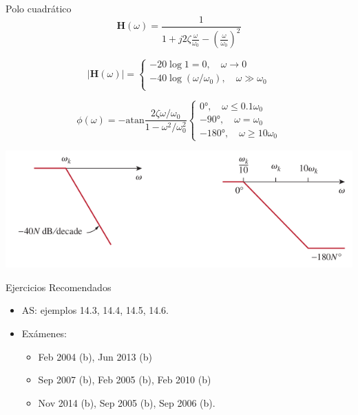 \documentclass[xcolor={usenames,svgnames,dvipsnames}]{beamer}
\newcommand{\fasor}[1]{\mathbf{#1}(\omega)}
\newcommand{\atan}{\mathrm{atan}}
\begin{document}
\begin{frame}[label={sec:org0720aa2}]{Polo cuadrático}
\[
  \fasor{H} = \frac{1}{1 + j 2 \zeta \frac{\omega}{\omega_0} - \left(\frac{\omega}{\omega_0}\right)^2} 
\]


\[
  |\fasor{H}| = 
  \begin{cases}
  - 20 \log 1 = 0, \quad \omega \to 0\\
  - 40 \log (\omega/\omega_0), \quad \omega \gg \omega_0\\
  \end{cases}
\]

\[
  \phi(\omega) = - \atan \frac{2\zeta\omega/\omega_0}{1 - \omega^2/\omega_0^2}
  \begin{cases}
    \ang{0},\quad \omega \leq 0.1\omega_0\\
    - \ang{90}, \quad \omega = \omega_0\\
    - \ang{180}, \quad \omega \geq 10 \omega_0
  \end{cases}
\]



\begin{center}
\includegraphics[width=.9\linewidth]{../figs/BodePoloCuadratico.pdf}
\end{center}
\end{frame}

\begin{frame}[label={sec:orgb29760a}]{Ejercicios Recomendados}
\begin{itemize}
\item AS: ejemplos 14.3, 14.4, 14.5, 14.6.
\item Exámenes:
\begin{itemize}
\item Feb 2004 (b), Jun 2013 (b)
\item Sep 2007 (b), Feb 2005 (b), Feb 2010 (b)
\item Nov 2014 (b), Sep 2005 (b), Sep 2006 (b).
\end{itemize}
\end{itemize}
\end{frame}
\end{document}
